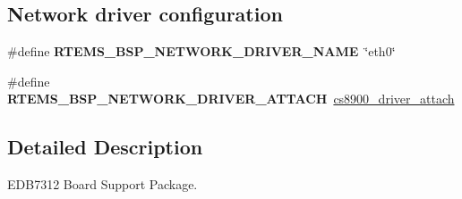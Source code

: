 \subsection*{Network driver configuration}
\begin{DoxyCompactItemize}
\item 
\mbox{\label{group__RTEMSBSPsARMEDB7312_ga86d4f9aa98431100692e31068070a8df}} 
\#define {\bfseries R\+T\+E\+M\+S\+\_\+\+B\+S\+P\+\_\+\+N\+E\+T\+W\+O\+R\+K\+\_\+\+D\+R\+I\+V\+E\+R\+\_\+\+N\+A\+ME}~\char`\"{}eth0\char`\"{}
\item 
\mbox{\label{group__RTEMSBSPsARMEDB7312_gadde0d66aef9442971dde465292ac14e6}} 
\#define {\bfseries R\+T\+E\+M\+S\+\_\+\+B\+S\+P\+\_\+\+N\+E\+T\+W\+O\+R\+K\+\_\+\+D\+R\+I\+V\+E\+R\+\_\+\+A\+T\+T\+A\+CH}~\mbox{\hyperlink{group__RTEMSBSPsARMEDB7312_ga6bc0d2aa6cdac399f8e347a93b8ca804}{cs8900\+\_\+driver\+\_\+attach}}
\end{DoxyCompactItemize}


\subsection{Detailed Description}
E\+D\+B7312 Board Support Package. 

